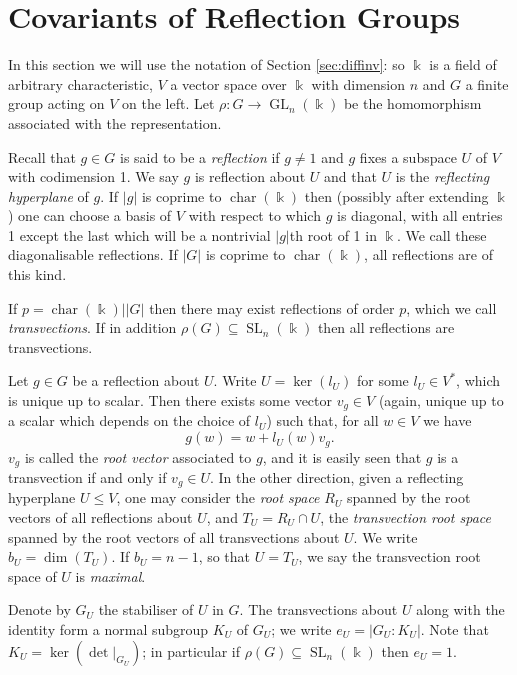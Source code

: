 \documentclass[a4paper]{amsart}
\newcommand{\kk}{\Bbbk}
\def\GL{\operatorname{GL}}
\def\SL{\operatorname{SL}}
\def\chr{\operatorname{char}}
\newtheorem*{Corollary of Conjecture}{Corollary of Conjecture}
\theoremstyle{definition}
\theoremstyle{remark}
\theoremstyle{Acknowledgments}
\begin{document}
\section{Covariants of Reflection Groups}\label{sec:refs}

In this section we will use the notation of Section \ref{sec:diffinv}: so $\kk$ is a field of arbitrary characteristic, $V$ a vector space over $\kk$ with dimension $n$ and $G$ a finite group acting on $V$ on the left. Let $\rho: G \rightarrow \GL_n(\kk)$ be the homomorphism associated with the representation.

Recall that $g \in G$ is said to be a {\it reflection} if $g  \neq 1$ and $g$ fixes a subspace $U$ of $V$ with codimension 1. We say $g$ is reflection about $U$ and that $U$ is the {\it reflecting hyperplane} of $g$. If $|g|$ is coprime to $\chr(\kk)$ then (possibly after extending $\kk$) one can choose a basis of $V$ with respect to which $g$ is diagonal, with all entries 1 except the last which will be a nontrivial $|g|$th root of 1 in $\kk$. We call these diagonalisable reflections. If $|G|$ is coprime to $\chr(\kk)$, all reflections are of this kind. 

If $p=\chr(\kk)| |G|$ then there may exist reflections of order $p$, which we call {\it transvections}. If in addition $\rho(G) \subseteq \SL_n(\kk)$ then all reflections are transvections.

Let $g \in G$ be a reflection about $U$. Write $U = \ker(l_U)$ for some $l_U \in V^*$, which is unique up to scalar. Then there exists some vector $v_g \in V$ (again, unique up to a scalar which depends on the choice of $l_U$) such that, for all $w \in V$ we have
\[g(w) = w + l_U(w)v_g.\]
$v_g$ is called the {\it root vector} associated to $g$, and it is easily seen that $g$ is a transvection if and only if $v_g \in U$. In the other direction, given a reflecting hyperplane $U \leq V$, one may consider the {\it root space} $R_U$ spanned by the root vectors of all reflections about $U$, and $T_U = R_U \cap U$, the {\it transvection root space} spanned by the root vectors of all transvections about $U$. We write $b_U = \dim(T_U)$. If $b_U=n-1$, so that $U=T_U$, we say the transvection root space of $U$ is {\it maximal}.

Denote by $G_U$ the stabiliser of $U$ in $G$. The transvections about $U$ along with the identity form a normal subgroup $K_U$ of $G_U$; we write $e_U = |G_U:K_U|$. Note that $K_U = \ker(\det|_{G_U})$; in particular if $\rho(G) \subseteq \SL_n(\kk)$ then $e_U=1$.
\end{document}

